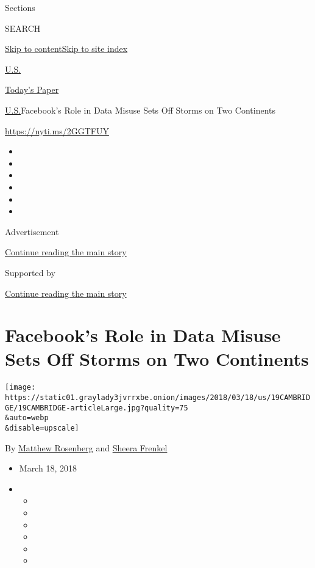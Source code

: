 Sections

SEARCH

\protect\hyperlink{site-content}{Skip to
content}\protect\hyperlink{site-index}{Skip to site index}

\href{https://www.nytimes3xbfgragh.onion/section/us}{U.S.}

\href{https://myaccount.nytimes3xbfgragh.onion/auth/login?response_type=cookie\&client_id=vi}{}

\href{https://www.nytimes3xbfgragh.onion/section/todayspaper}{Today's
Paper}

\href{/section/us}{U.S.}\textbar{}Facebook's Role in Data Misuse Sets
Off Storms on Two Continents

\url{https://nyti.ms/2GGTFUY}

\begin{itemize}
\item
\item
\item
\item
\item
\item
\end{itemize}

Advertisement

\protect\hyperlink{after-top}{Continue reading the main story}

Supported by

\protect\hyperlink{after-sponsor}{Continue reading the main story}

\hypertarget{facebooks-role-in-data-misuse-sets-off-storms-on-two-continents}{%
\section{Facebook's Role in Data Misuse Sets Off Storms on Two
Continents}\label{facebooks-role-in-data-misuse-sets-off-storms-on-two-continents}}

\texttt{[image: https://static01.graylady3jvrrxbe.onion/images/2018/03/18/us/19CAMBRIDGE/19CAMBRIDGE-articleLarge.jpg?quality=75\\\&auto=webp\\\&disable=upscale]}

By \href{http://www.nytimes3xbfgragh.onion/by/matthew-rosenberg}{Matthew
Rosenberg} and
\href{https://www.nytimes3xbfgragh.onion/by/sheera-frenkel}{Sheera
Frenkel}

\begin{itemize}
\item
  March 18, 2018
\item
  \begin{itemize}
  \item
  \item
  \item
  \item
  \item
  \item
  \end{itemize}
\end{itemize}

